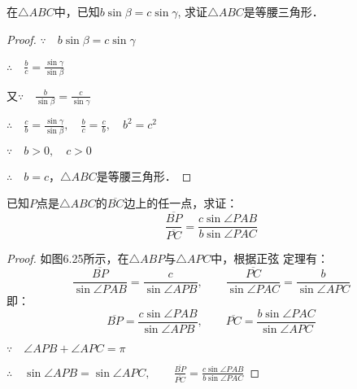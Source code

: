 \begin{example}
    在$\triangle ABC$中，已知$b\sin\beta=c\sin\gamma$, 求证$\triangle ABC$是等腰三角形．
\end{example}   

\begin{proof}
$\because\quad b\sin\beta=c\sin\gamma$

$\therefore\quad \frac{b}{c}=\frac{\sin\gamma}{\sin\beta}$

又$\because\quad \frac{b}{\sin\beta}=\frac{c}{\sin\gamma}$

$\therefore\quad \frac{c}{b}=\frac{\sin\gamma}{\sin\beta},\quad \frac{b}{c}=\frac{c}{b},\quad b^2=c^2$

$\because\quad b>0,\quad c>0$

$\therefore\quad b=c$，$\triangle ABC$是等腰三角形．
\end{proof}

\begin{example}
    已知$P$点是$\triangle ABC$的$\overline{BC}$边上的任一点，求证：
\[\frac{\overline{BP}}{\overline{PC}}=\frac{c\sin \angle PAB}{b\sin\angle PAC}\]
\end{example}

\begin{proof}
    如图6.25所示，在$\triangle ABP$与$\triangle APC$中，根据正弦
    定理有：
\[\frac{\overline{BP}}{\sin \angle PAB}=\frac{c}{\sin \angle APB},\qquad \frac{\overline{PC}}{\sin \angle PAC}=\frac{b}{\sin\angle APC}\]
即：    
\[\overline{BP}=\frac{c\sin \angle PAB}{\sin \angle APB},\qquad \overline{PC}=\frac{b\sin \angle PAC}{\sin \angle APC}\]

$\because\quad \angle APB+\angle APC=\pi$    

$\therefore\quad \sin \angle APB=\sin\angle APC,\qquad \frac{\overline{BP}}{\overline{PC}}=\frac{c\sin\angle PAB}{b\sin\angle PAC}$
\end{proof}

\begin{figure}[htp]
    \centering
{}
    \caption{}
\end{figure}

